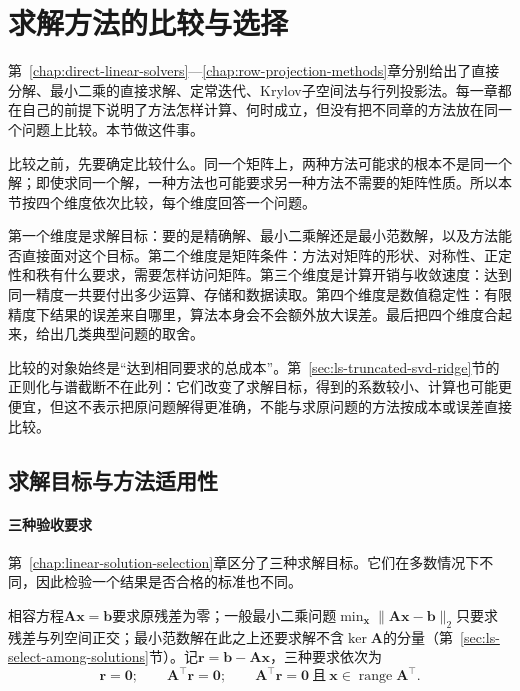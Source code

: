 \section{求解方法的比较与选择}
\label{sec:ls-method-selection}

第~\ref{chap:direct-linear-solvers}—\ref{chap:row-projection-methods}章分别给出了直接分解、最小二乘的直接求解、定常迭代、Krylov子空间法与行列投影法。每一章都在自己的前提下说明了方法怎样计算、何时成立，但没有把不同章的方法放在同一个问题上比较。本节做这件事。

比较之前，先要确定比较什么。同一个矩阵上，两种方法可能求的根本不是同一个解；即使求同一个解，一种方法也可能要求另一种方法不需要的矩阵性质。所以本节按四个维度依次比较，每个维度回答一个问题。

第一个维度是求解目标：要的是精确解、最小二乘解还是最小范数解，以及方法能否直接面对这个目标。第二个维度是矩阵条件：方法对矩阵的形状、对称性、正定性和秩有什么要求，需要怎样访问矩阵。第三个维度是计算开销与收敛速度：达到同一精度一共要付出多少运算、存储和数据读取。第四个维度是数值稳定性：有限精度下结果的误差来自哪里，算法本身会不会额外放大误差。最后把四个维度合起来，给出几类典型问题的取舍。

比较的对象始终是“达到相同要求的总成本”。第~\ref{sec:ls-truncated-svd-ridge}节的正则化与谱截断不在此列：它们改变了求解目标，得到的系数较小、计算也可能更便宜，但这不表示把原问题解得更准确，不能与求原问题的方法按成本或误差直接比较。

\subsection{求解目标与方法适用性}
\label{sec:ls-method-selection-goals}

\paragraph{三种验收要求}
第~\ref{chap:linear-solution-selection}章区分了三种求解目标。它们在多数情况下不同，因此检验一个结果是否合格的标准也不同。

相容方程$\bm A\bm x=\bm b$要求原残差为零；一般最小二乘问题$\min_{\bm x}\lVert\bm A\bm x-\bm b\rVert_2$只要求残差与列空间正交；最小范数解在此之上还要求解不含$\ker\bm A$的分量（第~\ref{sec:ls-select-among-solutions}节）。记$\bm r=\bm b-\bm A\bm x$，三种要求依次为
\begin{equation}
 \bm r=\bm0;\qquad
 \bm A^\top\bm r=\bm0;\qquad
 \bm A^\top\bm r=\bm0\ \text{且}\ \bm x\in\operatorname{range}\bm A^\top .
 \label{eq:ls-method-selection-acceptance}
\end{equation}

